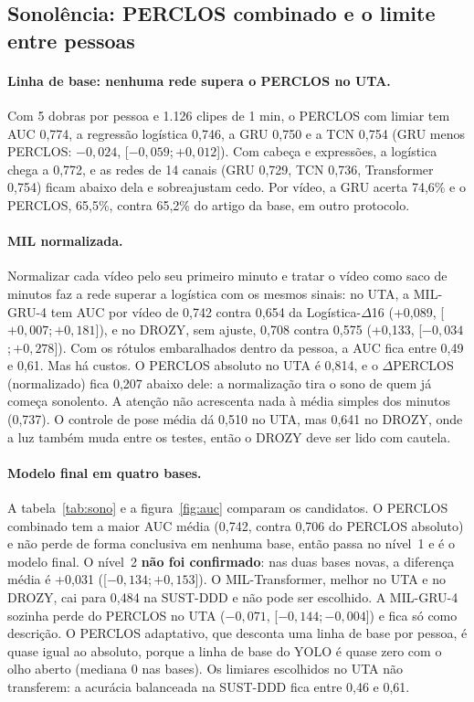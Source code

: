 \documentclass[11pt,a4paper]{article}
\newcommand{\ic}[2]{\textcolor{black!65}{[$#1$;\,$#2$]}}  %
\begin{document}
\subsection{Sonolência: PERCLOS combinado e o limite entre pessoas}
\label{sec:resB}

\paragraph{Linha de base: nenhuma rede supera o PERCLOS no UTA.} Com 5 dobras por pessoa e 1.126 clipes de 1 min, o PERCLOS com limiar tem AUC 0,774, a regressão logística 0,746, a GRU 0,750 e a TCN 0,754 (GRU menos PERCLOS: $-0{,}024$, \ic{-0{,}059}{+0{,}012}). Com cabeça e expressões, a logística chega a 0,772, e as redes de 14 canais (GRU 0,729, TCN 0,736, Transformer 0,754) ficam abaixo dela e sobreajustam cedo. Por vídeo, a GRU acerta 74,6\% e o PERCLOS, 65,5\%, contra 65,2\% do artigo da base, em outro protocolo.

\paragraph{MIL normalizada.} Normalizar cada vídeo pelo seu primeiro minuto e tratar o vídeo como saco de minutos faz a rede superar a logística com os mesmos sinais: no UTA, a MIL-GRU-4 tem AUC por vídeo de 0,742 contra 0,654 da Logística-$\Delta$16 (+0,089, \ic{+0{,}007}{+0{,}181}), e no DROZY, sem ajuste, 0,708 contra 0,575 (+0,133, \ic{-0{,}034}{+0{,}278}). Com os rótulos embaralhados dentro da pessoa, a AUC fica entre 0,49 e 0,61. Mas há custos. O PERCLOS absoluto no UTA é 0,814, e o $\Delta$PERCLOS (normalizado) fica 0,207 abaixo dele: a normalização tira o sono de quem já começa sonolento. A atenção não acrescenta nada à média simples dos minutos (0,737). O controle de pose média dá 0,510 no UTA, mas 0,641 no DROZY, onde a luz também muda entre os testes, então o DROZY deve ser lido com cautela.

\paragraph{Modelo final em quatro bases.} A tabela~\ref{tab:sono} e a figura~\ref{fig:auc} comparam os candidatos. O PERCLOS combinado tem a maior AUC média (0,742, contra 0,706 do PERCLOS absoluto) e não perde de forma conclusiva em nenhuma base, então passa no nível~1 e é o modelo final. O nível~2 \textbf{não foi confirmado}: nas duas bases novas, a diferença média é +0,031 (\ic{-0{,}134}{+0{,}153}). O MIL-Transformer, melhor no UTA e no DROZY, cai para 0,484 na SUST-DDD e não pode ser escolhido. A MIL-GRU-4 sozinha perde do PERCLOS no UTA ($-0{,}071$, \ic{-0{,}144}{-0{,}004}) e fica só como descrição. O PERCLOS adaptativo, que desconta uma linha de base por pessoa, é quase igual ao absoluto, porque a linha de base do YOLO é quase zero com o olho aberto (mediana 0 nas bases). Os limiares escolhidos no UTA não transferem: a acurácia balanceada na SUST-DDD fica entre 0,46 e 0,61.
\end{document}
